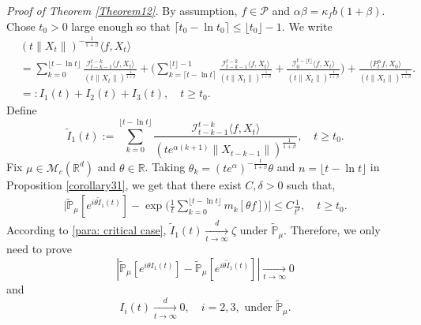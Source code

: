 \documentclass[12pt,a4paper]{amsart}
\theoremstyle{plain}
\theoremstyle{definition}
\numberwithin{equation}{section}
\begin{document}
{\it Proof of Theorem \ref{Theorem12}.}\quad
   By assumption, $f\in\mathcal{P}$ and  $\alpha\beta=\kappa_fb(1+\beta)$.
    Chose $t_0 > 0$ large enough so that $\lceil t_0-\ln t_0\rceil \leq \lfloor t_0 \rfloor - 1.$
    We write
    \begin{align*}
        &(t\|X_t\|)^{-\frac{1}{1+\beta}}\langle f,X_t\rangle
        \\ &=\sum_{k=0}^{\lfloor t-\ln t \rfloor} \frac{\mathcal I_{t-k-1}^{t-k}\langle f ,X_t\rangle}{(t\|X_t\|)^{\frac{1}{1+\beta}}}+\Big(\sum_{k=\lceil t-\ln t \rceil}^{\lfloor t \rfloor-1} \frac{\mathcal I_{t-k-1}^{t-k}\langle f ,X_t\rangle}{(t\|X_t\|)^{\frac{1}{1+\beta}}}+\frac{\mathcal I_0^{t-\lfloor t \rfloor}\langle f ,X_t\rangle}{(t\|X_t\|)^{\frac{1}{1+\beta}}}\Big) +
         \frac{\langle P^\alpha_tf,X_0\rangle}{(t\|X_t\|)^{\frac{1}{1+\beta}}}.
        \\&=:I_1(t)+I_2(t) + I_3(t),
        \quad t\geq t_0.
    \end{align*}
    Define
\[
    \tilde I_1(t)
    :=\sum_{k=0}^{\lfloor t-\ln t \rfloor}\frac{\mathcal I_{t-k-1}^{t-k}\langle f ,X_t\rangle}{(t e^{\alpha(k+1)}\|X_{t-k-1}\|)^{\frac{1}{1+\beta}}},
    \quad t\geq t_0.
\]
    Fix $\mu \in \mathcal M_c(\mathbb R^d)$ and $\theta\in \mathbb R$. Taking $\theta_k=(t e^{\alpha})^{-\frac{1}{1+\beta}} \theta $ and $n={\lfloor t-\ln t \rfloor}$
    in Proposition \ref{corollary31},
    we get that there exist $C,\delta>0$ such that,
\begin{align*}
        \Big|\mathbb{\tilde{P}}_{\mu} [e^{i\theta\tilde{I}_1(t)}]-\exp\Big(\frac{1}{t}\sum_{k=0}^{\lfloor t-\ln t \rfloor}m_k[\theta f]\Big)\Big|\leq C \frac{1}{t^{\delta}},
        \quad t\geq t_0.
\end{align*}
    According to \eqref{para: critical case},  $\tilde{I}_1(t)\xrightarrow[t\to \infty]{d}\zeta$ under $\tilde {\mathbb P}_\mu$.
    Therefore, we only need to prove
 \begin{equation}\label{toprove-1}|\mathbb{\tilde{P}}_{\mu}[e^{i\theta I_1(t)}]-\mathbb{\tilde{P}}_{\mu}[e^{i\theta\tilde{I}_1(t)}]|\xrightarrow[t\to \infty]{} 0
 \end{equation}
      and
     \begin{equation}\label{toprove-2}
     I_i(t)\xrightarrow[t\to \infty]{d} 0,\quad i = 2,3,  \mbox{ under } \tilde {\mathbb P}_\mu.\end{equation}
\end{document}
